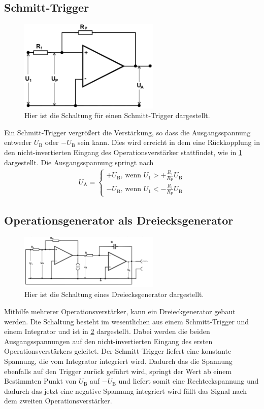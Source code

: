 \subsection{Schmitt-Trigger}
\begin{figure}[h!]
	\centering
	\includegraphics[width = 0.6\textwidth]{../Grafiken/Schmitt-Trigger.png}
	\caption{Hier ist die Schaltung für einen Schmitt-Trigger dargestellt. \cite{V51}\label{fig:Schmitt-Trigger}}
\end{figure}
Ein Schmitt-Trigger vergrößert die Verstärkung, so dass die Ausgangsspannung entweder $U_\text{B}$ oder $-U_\text{B}$ sein kann.
Dies wird erreicht in dem eine Rückkopplung in den nicht-invertierten Eingang des Operationsverstärker stattfindet, wie in \cref{fig:Schmitt-Trigger} dargestellt.
Die Ausgangsspannung springt nach
\begin{align}
	U_\text{A}=
	\begin{cases}
		+U_\text{B}\text{, wenn } U_1 > +\frac{R_1}{R_\text{P}}U_\text{B} \\
		-U_\text{B}\text{, wenn } U_1 < -\frac{R_1}{R_\text{P}}U_\text{B}
	\end{cases}
\end{align}
\newpage
\subsection{Operationsgenerator als Dreiecksgenerator}
\begin{figure}[h!]
	\centering
	\includegraphics[width = 0.6\textwidth]{../Grafiken/Dreieckgenerator.png}
	\caption{Hier ist die Schaltung eines Dreiecksgenerator dargestellt. \cite{V51} \label{fig:Dreieck}}
\end{figure}
Mithilfe mehrerer Operationsverstärker, kann ein Dreieckgenerator gebaut werden.
Die Schaltung besteht im wesentlichen aus einem Schmitt-Trigger und einem Integrator und ist in \cref{fig:Dreieck} dargestellt.
Dabei werden die beiden Ausgangsspannungen auf den nicht-invertierten Eingang des ersten Operationsverstärkers geleitet.
Der Schmitt-Trigger liefert eine konstante Spannung, die vom Integrator integriert wird.
Dadurch das die Spannung ebenfalls auf den Trigger zurück geführt wird, springt der Wert ab einem Bestimmten Punkt von $U_\text{B}$ auf $-U_\text{B}$ und liefert somit eine Rechteckspannung und dadurch das jetzt eine negative Spannung integriert wird fällt das Signal nach dem zweiten Operationsverstärker.

